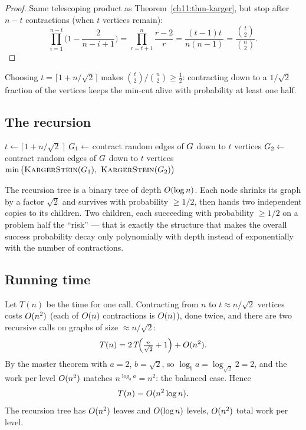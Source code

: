 \begin{proof}
Same telescoping product as Theorem~\ref{ch11:thm-karger}, but stop after $n-t$ contractions (when $t$ vertices remain):
\[
  \prod_{i=1}^{n-t}\Big(1-\frac{2}{n-i+1}\Big)
  = \prod_{r=t+1}^{n}\frac{r-2}{r}
  = \frac{(t-1)t}{n(n-1)} = \frac{\binom{t}{2}}{\binom{n}{2}}.
\]
\end{proof}

Choosing $t=\lceil 1+n/\sqrt2\rceil$ makes $\binom{t}{2}/\binom{n}{2}\ge \tfrac12$: contracting down to a $1/\sqrt2$ fraction of the vertices keeps the min-cut alive with probability at least one half.

\subsection{The recursion}

\begin{algorithm}[H]
\caption{\textsc{KargerStein}$(\Gph)$}
\label{ch11:alg-ks}
\DontPrintSemicolon
{}
$t \gets \big\lceil 1 + n/\sqrt2\,\big\rceil$\;
$G_1 \gets$ contract random edges of $G$ down to $t$ vertices\;
$G_2 \gets$ contract random edges of $G$ down to $t$ vertices 
\Return $\min\big(\textsc{KargerStein}(\Gph_1),\ \textsc{KargerStein}(\Gph_2)\big)$\;
\end{algorithm}

\begin{intuitionbox}
The recursion tree is a binary tree of depth $O(\log n)$. Each node shrinks its graph by a factor $\sqrt2$ and survives with probability $\ge 1/2$, then hands two independent copies to its children. Two children, each succeeding with probability $\ge 1/2$ on a problem half the ``risk'' --- that is exactly the structure that makes the overall success probability decay only polynomially with depth instead of exponentially with the number of contractions.
\end{intuitionbox}

\subsection{Running time}

Let $T(n)$ be the time for one call. Contracting from $n$ to $t\approx n/\sqrt2$ vertices costs $O(n^2)$ (each of $O(n)$ contractions is $O(n)$), done twice, and there are two recursive calls on graphs of size $\approx n/\sqrt2$:
\[
  T(n) = 2\,T\!\Big(\tfrac{n}{\sqrt2}+1\Big) + O(n^2).
\]
By the master theorem with $a=2$, $b=\sqrt2$, so $\log_b a = \log_{\sqrt2}2 = 2$, and the work per level $O(n^2)$ matches $n^{\log_b a}=n^2$: the balanced case. Hence
\[
  T(n) = O(n^2\log n).
\]
The recursion tree has $O(n^2)$ leaves and $O(\log n)$ levels, $O(n^2)$ total work per level.

